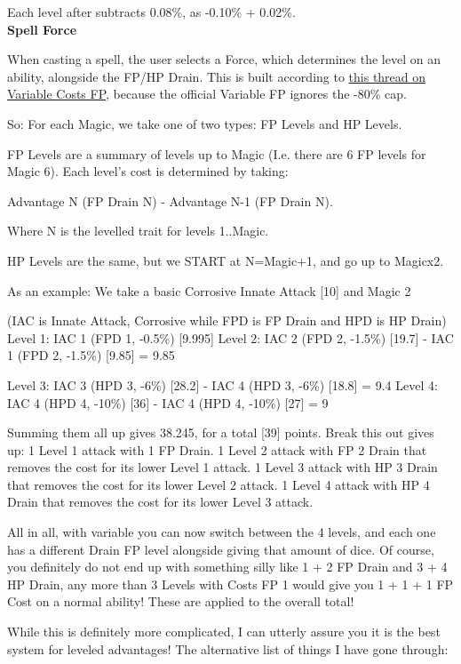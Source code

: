 \begin{multicols*}{2}
	Each level after subtracts 0.08\%, as -0.10\% + 0.02\%.\\
	
	\textbf{Spell Force\label{Spell Force}}
	
	When casting a spell, the user selects a Force, which determines the level on an ability, alongside the FP/HP Drain. This is built according to \textcolor{Blue}{\href{http://forums.sjgames.com/showpost.php?p=1399558&postcount=27}{this thread on Variable Costs FP}}, because the official Variable FP ignores the -80\% cap.
	
	So: For each Magic, we take one of two types: FP Levels and HP Levels.
	
	FP Levels are a summary of levels up to Magic (I.e. there are 6 FP levels for Magic 6). Each level's cost is determined by taking:
	
	Advantage N (FP Drain N) - Advantage N-1 (FP Drain N).
	
	Where N is the levelled trait for levels 1..Magic.
	
	HP Levels are the same, but we START at N=Magic+1, and go up to Magicx2.
	
	As an example: We take a basic Corrosive Innate Attack [10] and Magic 2
	
	(IAC is Innate Attack, Corrosive while FPD is FP Drain and HPD is HP Drain)
	Level 1: IAC 1 (FPD 1, -0.5\%) [9.995]
	Level 2: IAC 2 (FPD 2, -1.5\%) [19.7] - IAC 1 (FPD 2, -1.5\%) [9.85] = 9.85
	
	Level 3: IAC 3 (HPD 3, -6\%) [28.2] - IAC 4 (HPD 3, -6\%) [18.8] = 9.4
	Level 4: IAC 4 (HPD 4, -10\%) [36] - IAC 4 (HPD 4, -10\%) [27] = 9
	
	Summing them all up gives 38.245, for a total [39] points.
	Break this out gives up:
	1 Level 1 attack with 1 FP Drain.
	1 Level 2 attack with FP 2 Drain that removes the cost for its lower Level 1 attack.
	1 Level 3 attack with HP 3 Drain that removes the cost for its lower Level 2 attack.
	1 Level 4 attack with HP 4 Drain that removes the cost for its lower Level 3 attack.
	
	All in all, with variable you can now switch between the 4 levels, and each one has a different Drain FP level alongside giving that amount of dice. Of course, you definitely do not end up with something silly like 1 + 2 FP Drain and 3 + 4 HP Drain, any more than 3 Levels with Costs FP 1 would give you 1 + 1 + 1 FP Cost on a normal ability! These are applied to the overall total!
	
	While this is definitely more complicated, I can utterly assure you it is the best system for leveled advantages! The alternative list of things I have gone through:
	

\end{multicols*}
